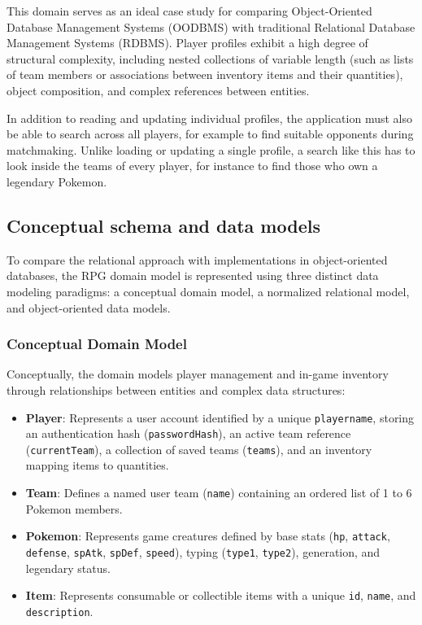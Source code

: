\documentclass{article}
\begin{document}
This domain serves as an ideal case study for comparing Object-Oriented Database Management Systems (OODBMS) with traditional Relational Database Management Systems (RDBMS). Player profiles exhibit a high degree of structural complexity, including nested collections of variable length (such as lists of team members or associations between inventory items and their quantities), object composition, and complex references between entities.

In addition to reading and updating individual profiles, the application must also be able to search across all players, for example to find suitable opponents during matchmaking. Unlike loading or updating a single profile, a search like this has to look inside the teams of every player, for instance to find those who own a legendary Pokemon.

\subsection{Conceptual schema and data models}

To compare the relational approach with implementations in object-oriented databases, the RPG domain model is represented using three distinct data modeling paradigms: a conceptual domain model, a normalized relational model, and object-oriented data models.

\subsubsection{Conceptual Domain Model}
Conceptually, the domain models player management and in-game inventory through relationships between entities and complex data structures:
\begin{itemize}
    \item \textbf{Player}: Represents a user account identified by a unique \texttt{playername}, storing an authentication hash (\texttt{passwordHash}), an active team reference (\texttt{currentTeam}), a collection of saved teams (\texttt{teams}), and an inventory mapping items to quantities.
    \item \textbf{Team}: Defines a named user team (\texttt{name}) containing an ordered list of 1 to 6 Pokemon members.
    \item \textbf{Pokemon}: Represents game creatures defined by base stats (\texttt{hp}, \texttt{attack}, \texttt{defense}, \texttt{spAtk}, \texttt{spDef}, \texttt{speed}), typing (\texttt{type1}, \texttt{type2}), generation, and legendary status.
    \item \textbf{Item}: Represents consumable or collectible items with a unique \texttt{id}, \texttt{name}, and \texttt{description}.
\end{itemize}
\end{document}
